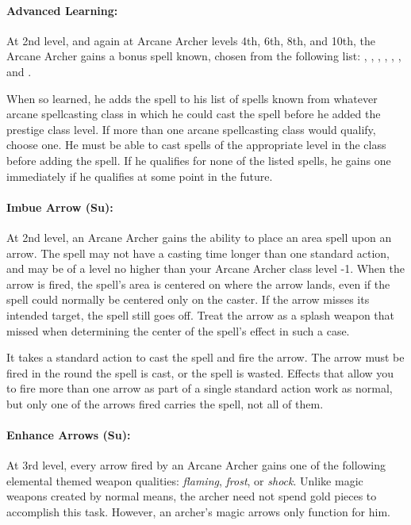 \paragraph{Advanced Learning:}
At 2nd level, and again at Arcane Archer levels 4th, 6th, 8th, and 10th, the Arcane Archer gains a bonus spell known, chosen from the following list: , , , , , , and .

When so learned, he adds the spell to his list of spells known from whatever arcane spellcasting class in which he could cast the  spell before he added the prestige class level. If more than one arcane spellcasting class would qualify, choose one. He must be able to cast spells of the appropriate level in the class before adding the spell. If he qualifies for none of the listed spells, he gains one immediately if he qualifies at some point in the future.

\paragraph{Imbue Arrow (Su):}
At 2nd level, an Arcane Archer gains the ability to place an area spell upon an arrow.
The spell may not have a casting time longer than one standard action, and may be of a level no higher than your Arcane Archer class level -1.
When the arrow is fired, the spell's area is centered on where the arrow lands, even if the spell could normally be centered only on the caster. If the arrow misses its intended target, the spell still goes off. Treat the arrow as a splash weapon that missed when determining the center of the spell's effect in such a case.

It takes a standard action to cast the spell and fire the arrow. 
The arrow must be fired in the round the spell is cast, or the spell is wasted.
Effects that allow you to fire more than one arrow as part of a single standard action work as normal, but only one of the arrows fired carries the spell, not all of them.
\paragraph{Enhance Arrows (Su):}
At 3rd level, every arrow fired by an Arcane Archer gains one of the following elemental themed weapon qualities: \emph{flaming}, \emph{frost}, or \emph{shock}. Unlike magic weapons created by normal means, the archer need not spend gold pieces to accomplish this task. However, an archer's magic arrows only function for him.

